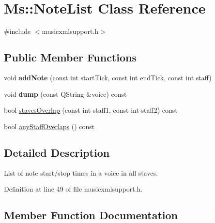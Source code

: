 \hypertarget{class_ms_1_1_note_list}{}\section{Ms\+:\+:Note\+List Class Reference}
\label{class_ms_1_1_note_list}


{\ttfamily \#include $<$musicxmlsupport.\+h$>$}

\subsection*{Public Member Functions}
\begin{DoxyCompactItemize}
\item 
\mbox{\label{class_ms_1_1_note_list_a50403f10c142acfdc5eed77a21602018}} 
void {\bfseries add\+Note} (const int start\+Tick, const int end\+Tick, const int staff)
\item 
\mbox{\label{class_ms_1_1_note_list_abbcdf9d72ac5e6df90964b55a4674a49}} 
void {\bfseries dump} (const Q\+String \&voice) const
\item 
bool \hyperlink{class_ms_1_1_note_list_aef910717b2f1d6843845a86456aa8df0}{staves\+Overlap} (const int staff1, const int staff2) const
\item 
bool \hyperlink{class_ms_1_1_note_list_a30936f3073c3e4da3f93ddddbf7e1c47}{any\+Staff\+Overlaps} () const
\end{DoxyCompactItemize}


\subsection{Detailed Description}
List of note start/stop times in a voice in all staves. 

Definition at line 49 of file musicxmlsupport.\+h.



\subsection{Member Function Documentation}
\mbox{\label{class_ms_1_1_note_list_a30936f3073c3e4da3f93ddddbf7e1c47}} 
